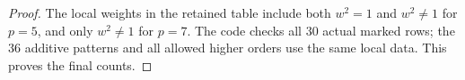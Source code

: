 \begin{proof}
The local weights in the retained table include both
$w^2=1$ and $w^2\ne1$ for $p=5$, and only $w^2\ne1$
for $p=7$. The code checks all $30$ actual marked rows;
the $36$ additive patterns and all allowed higher orders
use the same local data. This proves the final counts.
\end{proof}
